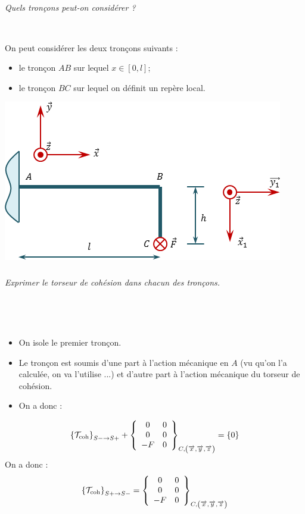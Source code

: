 \documentclass[10pt,fleqn]{article} %
\begin{document}
\begin{multicols}{2}
\subparagraph{}
\textit{Quels tronçons peut-on considérer ?}
\ifprof
\begin{corrige}~\\
\begin{minipage}[c]{.45\linewidth}
On peut considérer les deux tronçons suivants :
\begin{itemize}[label=,font=\color{ocre}] 
\item le tronçon $AB$ sur lequel $x\in[0,l]$;
\item le tronçon $BC$ sur lequel on définit un repère local.
\end{itemize}
\end{minipage} \hfill
\begin{minipage}[c]{.45\linewidth}
\begin{center}
\includegraphics[width=\linewidth]{images/exo_02_corr_01}
\end{center}
\end{minipage}
\end{corrige}
\else 
\fi

\subparagraph{}
\textit{Exprimer le torseur de cohésion dans chacun des tronçons.}

\ifprof
~\\
\begin{corrige} ~\\

\begin{itemize}[label=,font=\color{ocre}] 
\item On isole le premier tronçon.
\item Le tronçon est soumis d'une part à l'action mécanique en $A$ (vu qu'on l'a calculée, on va l'utilise ...) et d'autre part à l'action mécanique du torseur de cohésion.
\item On a donc :
\end{itemize}
$$
\torseurscoh_{S-\rightarrow S+} + \torseurcol{0}{0}{-F}{0}{0}{0}{C,\left( \vect{x},\vect{y},\vect{z} \right)} = \{0\}
$$
On a donc :
$$
\torseurscoh_{S+\rightarrow S-}
=\torseurcol{0}{0}{-F}{0}{0}{0}{C,\left( \vect{x},\vect{y},\vect{z} \right)}
$$


\end{corrige}
\end{multicols}
\end{document}
